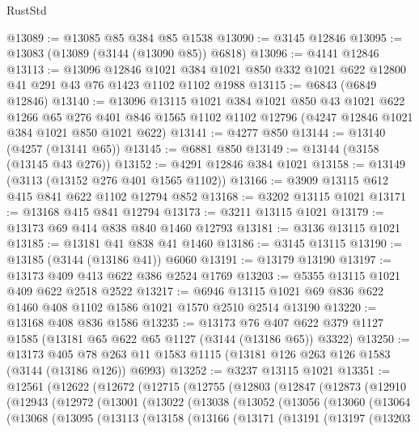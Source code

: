 \begin{lexlean}{RustStd}
\begin{coremodule}
@13089 := @13085 @85 @384 @85 @1538
@13090 := @3145 @12846
@13095 := @13083 (@13089 (@3144 (@13090 @85)) @6818)
@13096 := @4141 @12846
@13113 := @13096
    @12846
    @1021
    @384
    @1021
    @850
    @332
    @1021
    @622
    @12800
    @41
    @291
    @43
    @76
    @1423
    @1102
    @1102
    @1988
@13115 := @6843 (@6849 @12846)
@13140 := @13096
    @13115
    @1021
    @384
    @1021
    @850
    @43
    @1021
    @622
    @1266
    @65
    @276
    @401
    @846
    @1565
    @1102
    @1102
    @12796
    (@4247 @12846 @1021 @384 @1021 @850 @1021 @622)
@13141 := @4277 @850
@13144 := @13140 (@4257 (@13141 @65))
@13145 := @6881 @850
@13149 := @13144 (@3158 (@13145 @43 @276))
@13152 := @4291 @12846 @384 @1021
@13158 := @13149 (@3113 (@13152 @276 @401 @1565 @1102))
@13166 := @3909 @13115 @612 @415 @841 @622 @1102 @12794 @852
@13168 := @3202 @13115 @1021
@13171 := @13168 @415 @841 @12794
@13173 := @3211 @13115 @1021
@13179 := @13173 @69 @414 @838 @840 @1460 @12793
@13181 := @3136 @13115 @1021
@13185 := @13181 @41 @838 @41 @1460
@13186 := @3145 @13115
@13190 := @13185 (@3144 (@13186 @41)) @6060
@13191 := @13179 @13190
@13197 := @13173 @409 @413 @622 @386 @2524 @1769
@13203 := @5355 @13115 @1021 @409 @622 @2518 @2522
@13217 := @6946 @13115 @1021 @69 @836 @622 @1460 @408 @1102 @1586 @1021 @1570 @2510 @2514 @13190
@13220 := @13168 @408 @836 @1586
@13235 := @13173
    @76
    @407
    @622
    @379
    @1127
    @1585
    (@13181 @65 @622 @65 @1127 (@3144 (@13186 @65)) @3322)
@13250 := @13173
    @405
    @78
    @263
    @11
    @1583
    @1115
    (@13181 @126 @263 @126 @1583 (@3144 (@13186 @126)) @6993)
@13252 := @3237 @13115 @1021
@13351 := @12561
    (@12622
      (@12672
        (@12715
          (@12755
            (@12803
              (@12847
                (@12873
                  (@12910
                    (@12943
                      (@12972
                        (@13001
                          (@13022
                            (@13038
                              (@13052
                                (@13056
                                  (@13060
                                    (@13064
                                      (@13068
                                        (@13095
                                          (@13113
                                            (@13158
                                              (@13166
                                                (@13171
                                                  (@13191
                                                    (@13197
                                                      (@13203

\end{coremodule}
\end{lexlean}
